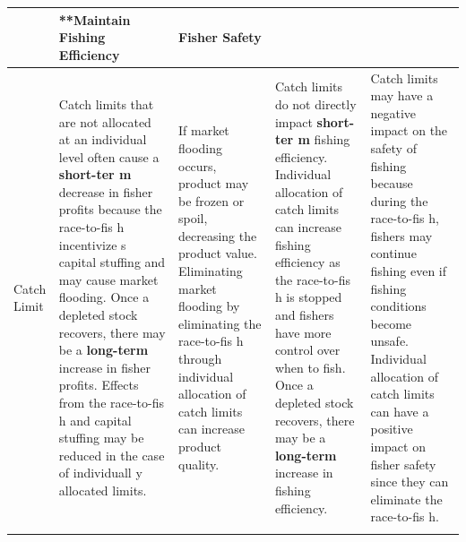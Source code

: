 \documentclass[]{book}
\begin{document}
\begin{longtable}[]{@{}lllll@{}}
\begin{minipage}[b]{0.17\columnwidth}
\end{minipage} & \begin{minipage}[b]{0.17\columnwidth}\raggedright\strut
**Maintain Fishing Efficiency\emph{ }\strut
\end{minipage} & \begin{minipage}[b]{0.17\columnwidth}\raggedright\strut
\textbf{Fisher Safety}\strut
\end{minipage}\tabularnewline
\midrule
\endhead
\begin{minipage}[t]{0.17\columnwidth}\raggedright\strut
Catch Limit\strut
\end{minipage} & \begin{minipage}[t]{0.17\columnwidth}\raggedright\strut
Catch limits that are not allocated at an individual level often cause a
\textbf{short-ter m} decrease in fisher profits because the race-to-fis
h incentivize s capital stuffing and may cause market flooding. Once a
depleted stock recovers, there may be a \textbf{long-term } increase in
fisher profits. Effects from the race-to-fis h and capital stuffing may
be reduced in the case of individuall y allocated limits.\strut
\end{minipage} & \begin{minipage}[t]{0.17\columnwidth}\raggedright\strut
If market flooding occurs, product may be frozen or spoil, decreasing
the product value. Eliminating market flooding by eliminating the
race-to-fis h through individual allocation of catch limits can increase
product quality.\strut
\end{minipage} & \begin{minipage}[t]{0.17\columnwidth}\raggedright\strut
Catch limits do not directly impact \textbf{short-ter m} fishing
efficiency. Individual allocation of catch limits can increase fishing
efficiency as the race-to-fis h is stopped and fishers have more control
over when to fish. Once a depleted stock recovers, there may be a
\textbf{long-term } increase in fishing efficiency.\strut
\end{minipage} & \begin{minipage}[t]{0.17\columnwidth}\raggedright\strut
Catch limits may have a negative impact on the safety of fishing because
during the race-to-fis h, fishers may continue fishing even if fishing
conditions become unsafe. Individual allocation of catch limits can have
a positive impact on fisher safety since they can eliminate the
race-to-fis h.\strut
\end{minipage}\tabularnewline
\begin{minipage}[t]{0.17\columnwidth}\raggedright\strut

\end{minipage}
\end{longtable}
\end{document}
